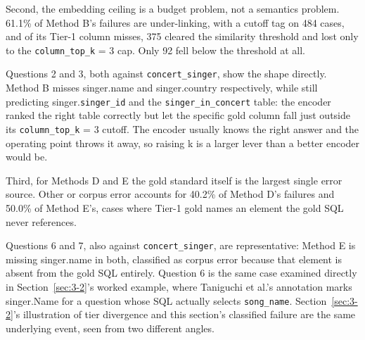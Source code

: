 Second, the embedding ceiling is a budget problem, not a semantics problem. 61.1\% of Method B's failures are under-linking, with a cutoff tag on 484 cases, and of its Tier-1 column misses, 375 cleared the similarity threshold and lost only to the \texttt{column\_top\_k} = 3 cap. Only 92 fell below the threshold at all.

Questions 2 and 3, both against \texttt{concert\_singer}, show the shape directly. Method B misses singer.name and singer.country respectively, while still predicting singer.\texttt{singer\_id} and the \texttt{singer\_in\_concert} table: the encoder ranked the right table correctly but let the specific gold column fall just outside its \texttt{column\_top\_k} = 3 cutoff. The encoder usually knows the right answer and the operating point throws it away, so raising k is a larger lever than a better encoder would be.

Third, for Methods D and E the gold standard itself is the largest single error source. Other or corpus error accounts for 40.2\% of Method D's failures and 50.0\% of Method E's, cases where Tier-1 gold names an element the gold SQL never references.

Questions 6 and 7, also against \texttt{concert\_singer}, are representative: Method E is missing singer.name in both, classified as corpus error because that element is absent from the gold SQL entirely. Question 6 is the same case examined directly in Section~\ref{sec:3-2}'s worked example, where Taniguchi et al.'s annotation marks singer.Name for a question whose SQL actually selects \texttt{song\_name}. Section~\ref{sec:3-2}'s illustration of tier divergence and this section's classified failure are the same underlying event, seen from two different angles.
